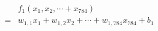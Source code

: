 \documentclass[preview]{standalone}
\begin{document}
\begin{align*}
&f_ {1} ( x_ {1} , x_ {2} , \cdots + x_ {784} ) \\ = & w_ {1 , 1} x_ {1} + w_ {1 , 2} x_ {2} + \cdots + w_ {1 , 784} x_ {784} + b_ {1}
\end{align*}
\end{document}
